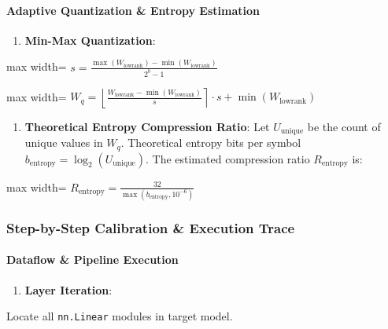 \paragraph{Adaptive Quantization \& Entropy Estimation}

\begin{enumerate}
\item \textbf{Min-Max Quantization}:
\end{enumerate}
\begin{center}
\begin{adjustbox}{max width=\columnwidth}
$\displaystyle
s = \frac{\max(W_{\text{lowrank}}) - \min(W_{\text{lowrank}})}{2^b - 1}
$
\end{adjustbox}
\end{center}
\begin{center}
\begin{adjustbox}{max width=\columnwidth}
$\displaystyle
W_q = \left\lfloor \frac{W_{\text{lowrank}} - \min(W_{\text{lowrank}})}{s} \right\rceil \cdot s + \min(W_{\text{lowrank}})
$
\end{adjustbox}
\end{center}

\begin{enumerate}
\item \textbf{Theoretical Entropy Compression Ratio}:
Let $U_{\text{unique}}$ be the count of unique values in $W_q$. Theoretical entropy bits per symbol $b_{\text{entropy}} = \log_2(U_{\text{unique}})$. The estimated compression ratio $R_{\text{entropy}}$ is:
\end{enumerate}
\begin{center}
\begin{adjustbox}{max width=\columnwidth}
$\displaystyle
R_{\text{entropy}} = \frac{32}{\max\left( b_{\text{entropy}}, 10^{-6} \right)}
$
\end{adjustbox}
\end{center}


\subsubsection*{Step-by-Step Calibration \& Execution Trace}

\paragraph{Dataflow \& Pipeline Execution}

\begin{enumerate}
\item \textbf{Layer Iteration}:
\end{enumerate}
Locate all \texttt{nn.Linear} modules in target model.

